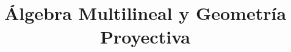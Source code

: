 \documentclass[12pt]{article}
\theoremstyle{normal}
\theoremstyle{break}
\theoremstyle{breakthm}
\begin{document}
\date{}

\title{Álgebra Multilineal y Geometría Proyectiva}
 
\maketitle

\tableofcontents

\setcounter{section}{-1}




\end{document}
